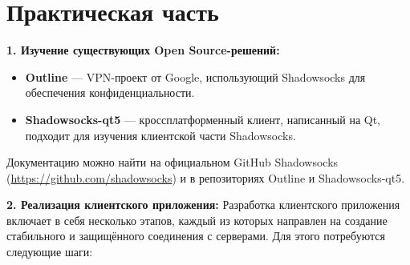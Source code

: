 \documentclass{SCWorks}
\begin{document}
\newpage

\section{Практическая часть}

\textbf{1. Изучение существующих Open Source-решений:}
\begin{itemize}
    \item \textbf{Outline} --- VPN-проект от Google, использующий Shadowsocks для обеспечения конфиденциальности.
    \item \textbf{Shadowsocks-qt5} --- кроссплатформенный клиент, написанный на Qt, подходит для изучения клиентской части Shadowsocks.
\end{itemize}
Документацию можно найти на официальном GitHub Shadowsocks (\url{https://github.com/shadowsocks}) и в репозиториях Outline и Shadowsocks-qt5.

\textbf{2. Реализация клиентского приложения:}  
Разработка клиентского приложения включает в себя несколько этапов, каждый из которых направлен на создание стабильного и защищённого соединения с серверами. Для этого потребуются следующие шаги:
\end{document}
